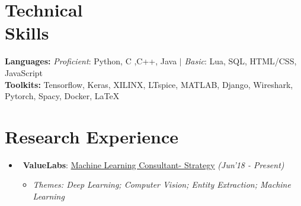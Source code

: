 \documentclass[margin,line]{templates/resume}
\newcommand{\compresslist}{%
\setlength{\itemsep}{3pt}%
\setlength{\parskip}{0pt}%
\setlength{\parsep}{0pt}%
}
\begin{document}
\begin{resume}


\vspace{-0.1cm}    
\section{\mysidestyle Technical\\ Skills}
\textbf{Languages:} \textit{Proficient}: Python, C ,C++, Java $|$ \textit{Basic}: Lua, SQL, HTML/CSS, JavaScript \\
\textbf{Toolkits:} Tensorflow, Keras, XILINX, LTspice, MATLAB, Django, Wireshark, Pytorch, Spacy, Docker, LaTeX

\vspace{-0.1cm}
\section{\mysidestyle Research Experience} 
\vspace{-0.01cm}
\begin{itemize}[leftmargin = 0.7cm]\compresslist
\item~\textbf{ValueLabs}: \href{https://www.valuelabs.com/}{Machine Learning Consultant- Strategy} \hfill{\small\textit{(Jun'18 - Present)}} \vspace{-1mm}
\begin{itemize}[leftmargin=*]\compresslist
        \item[]\small\textit{Themes: Deep Learning; Computer Vision; Entity Extraction; Machine Learning}
    \end{itemize}
  

\end{itemize}
\end{resume}
\end{document}
